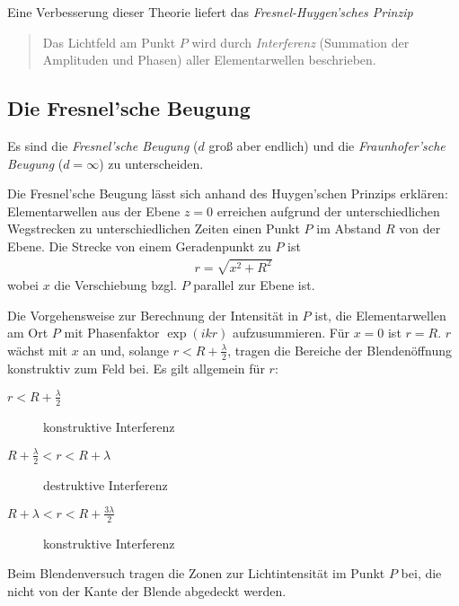 Eine Verbesserung dieser Theorie liefert das 
\emph{Fresnel-Huygen'sches Prinzip}
\begin{quote}
  Das Lichtfeld am Punkt $P$ wird durch \emph{Interferenz} (Summation
  der Amplituden und Phasen) aller Elementarwellen beschrieben.
\end{quote}


\subsection{Die Fresnel'sche Beugung}
Es sind die \emph{Fresnel'sche Beugung} 
($d$ groß aber endlich) und die \emph{Fraunhofer'sche Beugung}%
 ($d=\infty$) zu unterscheiden.

Die Fresnel'sche Beugung lässt sich anhand des Huygen'schen Prinzips
erklären:
Elementarwellen aus der Ebene $z=0$ erreichen aufgrund der
unterschiedlichen Wegstrecken zu unterschiedlichen Zeiten einen Punkt
$P$ im Abstand $R$ von der Ebene.
Die Strecke von einem Geradenpunkt zu $P$ ist
\begin{gather*}
  r = \sqrt{x^2+R^2}
\end{gather*}
wobei $x$ die Verschiebung bzgl. $P$ parallel zur Ebene ist.

Die Vorgehensweise zur Berechnung der Intensität in $P$ ist, die
Elementarwellen am Ort $P$ mit Phasenfaktor $\exp(ikr)$ aufzusummieren.
Für $x=0$ ist $r=R$. $r$ wächst mit $x$ an und, solange $r<R+\frac{\lambda}{2}$, tragen die
Bereiche der Blendenöffnung konstruktiv zum Feld bei.
Es gilt allgemein für $r$:
\begin{description}
\item[$r<R+\frac{\lambda}{2}$] konstruktive Interferenz
\item[$R+\frac{\lambda}{2}<r<R+\lambda$] destruktive Interferenz
\item[$R+\lambda<r<R+\frac{3\lambda}{2}$] konstruktive Interferenz
\end{description}

Beim Blendenversuch tragen die Zonen zur Lichtintensität im Punkt $P$
bei, die nicht von der Kante der Blende abgedeckt werden.

